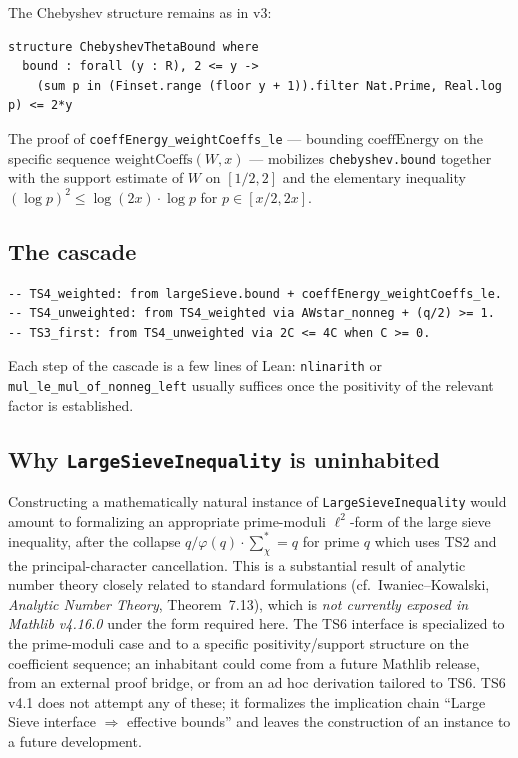 \documentclass[11pt,a4paper]{article}
\theoremstyle{definition}
\begin{document}
The Chebyshev structure remains as in v3:

\begin{lstlisting}
structure ChebyshevThetaBound where
  bound : forall (y : R), 2 <= y ->
    (sum p in (Finset.range (floor y + 1)).filter Nat.Prime, Real.log p) <= 2*y
\end{lstlisting}

The proof of \verb|coeffEnergy_weightCoeffs_le| --- bounding $\mathrm{coeffEnergy}$ on the specific sequence $\mathrm{weightCoeffs}(W, x)$ --- mobilizes \verb|chebyshev.bound| together with the support estimate of $W$ on $[1/2, 2]$ and the elementary inequality $(\log p)^2 \leq \log(2x) \cdot \log p$ for $p \in [x/2, 2x]$.

\subsection{The cascade}

\begin{lstlisting}
-- TS4_weighted: from largeSieve.bound + coeffEnergy_weightCoeffs_le.
-- TS4_unweighted: from TS4_weighted via AWstar_nonneg + (q/2) >= 1.
-- TS3_first: from TS4_unweighted via 2C <= 4C when C >= 0.
\end{lstlisting}

Each step of the cascade is a few lines of Lean: \verb|nlinarith| or \verb|mul_le_mul_of_nonneg_left| usually suffices once the positivity of the relevant factor is established.

\subsection{Why \texttt{LargeSieveInequality} is uninhabited}

Constructing a mathematically natural instance of \verb|LargeSieveInequality| would amount to formalizing an appropriate prime-moduli $\ell^2$-form of the large sieve inequality, after the collapse $q/\varphi(q) \cdot \sum^*_{\chi} = q$ for prime $q$ which uses TS2 and the principal-character cancellation. This is a substantial result of analytic number theory closely related to standard formulations (cf.\ Iwaniec--Kowalski, \emph{Analytic Number Theory}, Theorem~7.13), which is \emph{not currently exposed in Mathlib v4.16.0} under the form required here. The TS6 interface is specialized to the prime-moduli case and to a specific positivity/support structure on the coefficient sequence; an inhabitant could come from a future Mathlib release, from an external proof bridge, or from an ad hoc derivation tailored to TS6. TS6 v4.1 does not attempt any of these; it formalizes the implication chain ``Large Sieve interface $\Rightarrow$ effective bounds'' and leaves the construction of an instance to a future development.
\end{document}
